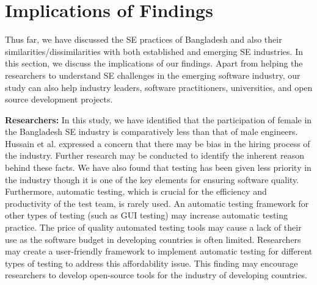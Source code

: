 \section{Implications of Findings}


\label{implications}
Thus far, we have discussed the SE practices of Bangladesh and also their similarities/dissimilarities with both established and emerging SE industries. In this section, we discuss the implications of our findings. Apart from helping the researchers to understand SE challenges in the emerging software industry, our study can also help industry leaders, software practitioners, universities, and open source development projects.

\indent \textbf{Researchers:} In this study, we have identified that the participation of female in the Bangladesh SE industry is comparatively less than that of male engineers.  Hussain et al.\cite{Hussain2020} expressed a concern that there may be bias in the hiring process of the industry. Further research may be conducted to identify the inherent reason behind these facts. We have also found that testing has been given less priority in the industry though it is one of the key elements for ensuring software quality. Furthermore, automatic testing, which is crucial for the efficiency and productivity of the test team, is rarely used. An automatic testing framework for other types of testing (such as GUI testing) may increase automatic testing practice. The price of quality automated testing tools may cause a lack of their use as the software budget in developing countries is often limited. Researchers may create a user-friendly framework to implement automatic testing for different types of testing to address this affordability issue. This finding may encourage researchers to develop open-source tools for the industry of developing countries. 



